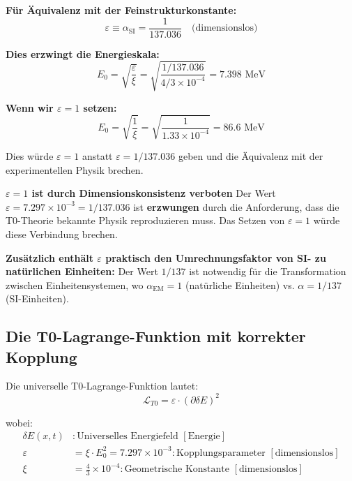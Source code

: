 \documentclass[12pt,a4paper]{article}
\numberwithin{equation}{section}
\newcommand{\xipar}{\xi}
\newcommand{\epsilonT}{\varepsilon}
\newcommand{\alphaSI}{\alpha_{\text{SI}}}
\newcommand{\calL}{\mathcal{L}}
\newcommand{\Eo}{E_0}
\begin{document}
	\textbf{Für Äquivalenz mit der Feinstrukturkonstante:}
	\begin{equation}
		\epsilonT \equiv \alphaSI = \frac{1}{137.036} \quad \text{(dimensionslos)}
		\label{eq:equivalence_simple}
	\end{equation}
	
	\textbf{Dies erzwingt die Energieskala:}
	\begin{equation}
		\Eo = \sqrt{\frac{ \epsilonT}{\xipar}} = \sqrt{\frac{1/137.036}{4/3 \times 10^{-4}}} = 7.398 \text{ MeV}
		\label{eq:e0_forced}
	\end{equation}
	
	\textbf{Wenn wir $\epsilonT = 1$ setzen:}
	\begin{equation}
		\Eo = \sqrt{\frac{1}{\xipar}} = \sqrt{\frac{1}{1.33 \times 10^{-4}}} = 86.6 \text{ MeV}
		\label{eq:e0_wrong}
	\end{equation}
	
	Dies würde $\epsilonT = 1$ anstatt $\epsilonT = 1/137.036$ geben und die Äquivalenz mit der experimentellen Physik brechen.
	
\begin{tcolorbox}[title={\textbf{SCHLUSSFOLGERUNG}},colframe=blue,colback=blue!5]
	\textbf{$\epsilonT = 1$ ist durch Dimensionskonsistenz verboten}
	Der Wert $\epsilonT = 7.297 \times 10^{-3} = 1/137.036$ ist \textbf{erzwungen} durch die Anforderung, dass die T0-Theorie bekannte Physik reproduzieren muss. Das Setzen von $\epsilonT = 1$ würde diese Verbindung brechen.
	
	\textbf{Zusätzlich enthält $\epsilonT$ praktisch den Umrechnungsfaktor von SI- zu natürlichen Einheiten:} Der Wert $1/137$ ist notwendig für die Transformation zwischen Einheitensystemen, wo $\alpha_{\text{EM}} = 1$ (natürliche Einheiten) vs. $\alpha = 1/137$ (SI-Einheiten).
\end{tcolorbox}
	
	\subsection{Die T0-Lagrange-Funktion mit korrekter Kopplung}
	
	Die universelle T0-Lagrange-Funktion lautet:
	\begin{equation}
		\calL_{T0} = \epsilonT \cdot (\partial \delta E)^2
		\label{eq:t0_lagrangian}
	\end{equation}
	
	wobei:
	\begin{align}
		\delta E(x,t) &: \text{Universelles Energiefeld } [\text{Energie}]\\
		\epsilonT &= \xipar \cdot \Eo^2 = 7.297 \times 10^{-3} : \text{Kopplungsparameter } [\text{dimensionslos}]\\
		\xipar &= \frac{4}{3} \times 10^{-4} : \text{Geometrische Konstante } [\text{dimensionslos}]
	\end{align}
	
\end{document}
